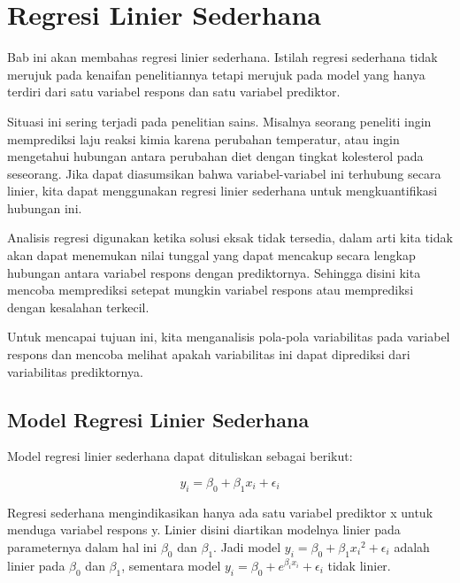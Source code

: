 \documentclass[
]{book}
\begin{document}
\hypertarget{regresi-linier-sederhana}{%
\chapter{Regresi Linier Sederhana}\label{regresi-linier-sederhana}}

Bab ini akan membahas regresi linier sederhana. Istilah regresi sederhana tidak merujuk pada kenaifan penelitiannya tetapi merujuk pada model yang hanya terdiri dari satu variabel respons dan satu variabel prediktor.

Situasi ini sering terjadi pada penelitian sains. Misalnya seorang peneliti ingin memprediksi laju reaksi kimia karena perubahan temperatur, atau ingin mengetahui hubungan antara perubahan diet dengan tingkat kolesterol pada seseorang. Jika dapat diasumsikan bahwa variabel-variabel ini terhubung secara linier, kita dapat menggunakan regresi linier sederhana untuk mengkuantifikasi hubungan ini.

Analisis regresi digunakan ketika solusi eksak tidak tersedia, dalam arti kita tidak akan dapat menemukan nilai tunggal yang dapat mencakup secara lengkap hubungan antara variabel respons dengan prediktornya. Sehingga disini kita mencoba memprediksi setepat mungkin variabel respons atau memprediksi dengan kesalahan terkecil.

Untuk mencapai tujuan ini, kita menganalisis pola-pola variabilitas pada variabel respons dan mencoba melihat apakah variabilitas ini dapat diprediksi dari variabilitas prediktornya.

\hypertarget{model-regresi-linier-sederhana}{%
\section{Model Regresi Linier Sederhana}\label{model-regresi-linier-sederhana}}

Model regresi linier sederhana dapat dituliskan sebagai berikut:

\begin{equation} 
y_i=\beta_0 + \beta_1x_i+ \epsilon_i
\label{eq:persamaan-umum}
\end{equation}

Regresi sederhana mengindikasikan hanya ada satu variabel prediktor x untuk menduga variabel respons y. Linier disini diartikan modelnya linier pada parameternya dalam hal ini \(\beta_0\) dan \(\beta_1\). Jadi model \(y_i = \beta_0 + \beta_1{x_i}^2 + \epsilon_i\) adalah linier pada \(\beta_0\) dan \(\beta_1\), sementara model \(y_i = \beta_0 + e^{\beta_ix_i} + \epsilon_i\) tidak linier.
\end{document}
